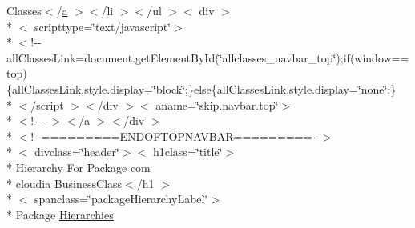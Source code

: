 \begin{DoxyCompactItemize}
\item 
Classes$<$/\hyperlink{style_8css_a5e8981582017bb8b84c21f148345d1f7}{a} $>$$<$/li $>$$<$/ul $>$$<$ div $>$\\*
$<$ scripttype=\char`\"{}text/javascript\char`\"{}$>$\\*
$<$!-\/-\/all\-Classes\-Link=document.\-get\-Element\-By\-Id(\char`\"{}allclasses\-\_\-navbar\-\_\-top\char`\"{});if(window==top)\{all\-Classes\-Link.\-style.\-display=\char`\"{}block\char`\"{};\}else\{all\-Classes\-Link.\-style.\-display=\char`\"{}none\char`\"{};\}\\*
$<$/script $>$$<$/div $>$$<$ aname=\char`\"{}skip.\-navbar.\-top\char`\"{}$>$\\*
$<$!-\/-\/-\/-\/$>$$<$/a $>$$<$/div $>$\\*
$<$!-\/-\/=========E\-N\-D\-O\-F\-T\-O\-P\-N\-A\-V\-B\-A\-R=========-\/-\/$>$\\*
$<$ divclass=\char`\"{}header\char`\"{}$>$$<$ h1class=\char`\"{}title\char`\"{}$>$\\*
 Hierarchy For Package com \\*
cloudia Business\-Class$<$/h1 $>$\\*
$<$ spanclass=\char`\"{}package\-Hierarchy\-Label\char`\"{}$>$\\*
 Package \hyperlink{com_2cloudia_2_business_class_2package-tree_8html_a61756be46a402af7f615c5804b0f0b50}{Hierarchies}
\end{DoxyCompactItemize}


